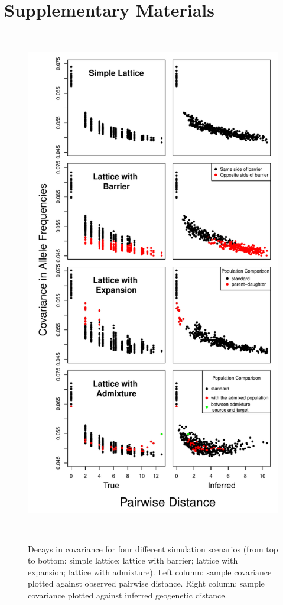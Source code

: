 \documentclass[12pt]{article}
\begin{document}
\section*{Supplementary Materials}
\renewcommand{\thefigure}{S\arabic{figure}}
\setcounter{figure}{0}
\renewcommand{\thetable}{S\arabic{table}}
\setcounter{table}{0}
\renewcommand{\theequation}{S\arabic{table}}
\setcounter{equation}{0}

\begin{figure}
	\centering
		{\includegraphics[width=4.8in,height=8.8in]{figs/sims/sim_covariance_decays.pdf}}
		\caption{Decays in covariance for four different simulation scenarios (from top to bottom: simple lattice; lattice with barrier; lattice with expansion; lattice with admixture).  Left column: sample covariance plotted against observed pairwise distance.  Right column: sample covariance plotted against inferred geogenetic distance.}
	\label{sfig:sim_covariance_decays}
\end{figure}
\end{document}
